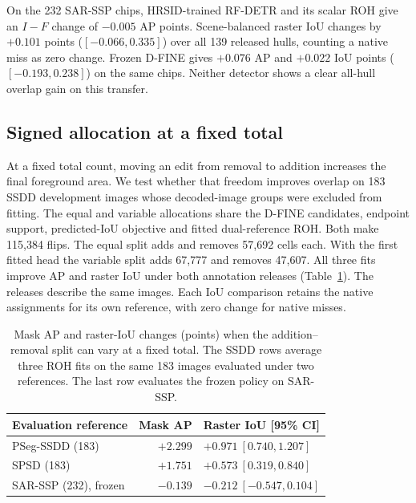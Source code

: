 \documentclass[journal]{IEEEtran}
\begin{document}
On the 232 SAR-SSP chips, HRSID-trained RF-DETR and its scalar ROH give an \(I-F\) change of \(-0.005\) AP points. Scene-balanced raster IoU changes by \(+0.101\) points (\([-0.066,0.335]\)) over all 139 released hulls, counting a native miss as zero change. Frozen D-FINE gives \(+0.076\) AP and \(+0.022\) IoU points (\([-0.193,0.238]\)) on the same chips. Neither detector shows a clear all-hull overlap gain on this transfer.

\subsection{Signed allocation at a fixed total}
\label{sec:variable-sign-results}
At a fixed total count, moving an edit from removal to addition increases the final foreground area. We test whether that freedom improves overlap on 183 SSDD development images whose decoded-image groups were excluded from fitting. The equal and variable allocations share the D-FINE candidates, endpoint support, predicted-IoU objective and fitted dual-reference ROH. Both make 115,384 flips. The equal split adds and removes 57,692 cells each. With the first fitted head the variable split adds 67,777 and removes 47,607. All three fits improve AP and raster IoU under both annotation releases (Table~\ref{tab:dual-sign-seeds}). The releases describe the same images. Each IoU comparison retains the native assignments for its own reference, with zero change for native misses.

\begin{table}[t]
\centering
\caption{Mask AP and raster-IoU changes (points) when the addition--removal split can vary at a fixed total. The SSDD rows average three ROH fits on the same 183 images evaluated under two references. The last row evaluates the frozen policy on SAR-SSP.}
\label{tab:dual-sign-seeds}
\footnotesize
\setlength{\tabcolsep}{3.5pt}
\begin{tabular}{@{}lrl@{}}
\toprule
Evaluation reference & Mask AP & Raster IoU [95\% CI]\\
\midrule
PSeg-SSDD (183) & \(+2.299\) & \(+0.971\ [0.740,1.207]\)\\
SPSD (183) & \(+1.751\) & \(+0.573\ [0.319,0.840]\)\\
SAR-SSP (232), frozen & \(-0.139\) & \(-0.212\ [-0.547,0.104]\)\\
\bottomrule
\end{tabular}
\end{table}
\end{document}

